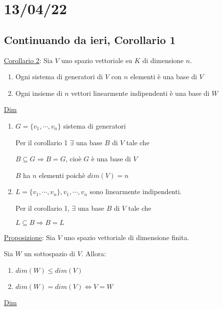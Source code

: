 \documentclass{article}
\newcommand{\ul}[1]{\underline{#1}}
\begin{document}
\section{13/04/22}
\subsection{Continuando da ieri, Corollario 1}
\ul{Corollario 2}: Sia $V$ uno spazio vettoriale su $K$ di dimensione $n$.
\begin{enumerate}
	\item Ogni sistema di generatori di $V$ con $n$ elementi è una base di $V$
	\item Ogni insieme di $n$ vettori linearmente indipendenti è una base di $W$
\end{enumerate}

\ul{Dim}
\begin{enumerate}
	\item $G=\{v_1,\cdots,v_n\}$ sistema di generatori

	      Per il corollario 1 $\exists$ una base $B$ di $V$ tale che

	      $B\subseteq G\Rightarrow B=G$, cioè $G$ è una base di $V$

	      $B$ ha $n$ elementi poichè $dim(V)=n$
	\item $L=\{v_1,\cdots,v_n\},v_1,\cdots,v_n$ sono linearmente indipendenti.

	      Per il corollario 1, $\exists$ una base $B$ di $V$ tale che

	      $L\subseteq B\Rightarrow B=L$
\end{enumerate}

\ul{Proposizione}: Sia $V$ uno spazio vettoriale di dimensione finita.

Sia $W$ un sottospazio di $V$. Allora:
\begin{enumerate}
	\item $dim(W)\le dim(V)$
	\item $dim(W)=dim(V)\Leftrightarrow V=W$
\end{enumerate}

\ul{Dim}
\end{document}
